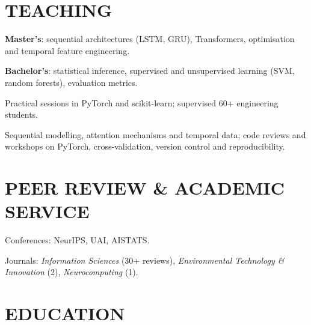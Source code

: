 \section{TEACHING}
\begin{cvitems}
  \item \textbf{Master’s}: sequential architectures (LSTM, GRU), Transformers, optimisation and temporal feature engineering.
  \item \textbf{Bachelor’s}: statistical inference, supervised and unsupervised learning (SVM, random forests), evaluation metrics.
  \item Practical sessions in PyTorch and scikit-learn; supervised 60+ engineering students.
\end{cvitems}
\begin{cvitems}
  \item Sequential modelling, attention mechanisms and temporal data; code reviews and workshops on PyTorch, cross-validation, version control and reproducibility.
\end{cvitems}

\section{PEER REVIEW \& ACADEMIC SERVICE}
\begin{cvitems}
  \item Conferences: NeurIPS, UAI, AISTATS.
  \item Journals: \textit{Information Sciences} (30+ reviews), \textit{Environmental Technology \& Innovation} (2), \textit{Neurocomputing} (1).
\end{cvitems}

\section{EDUCATION}

